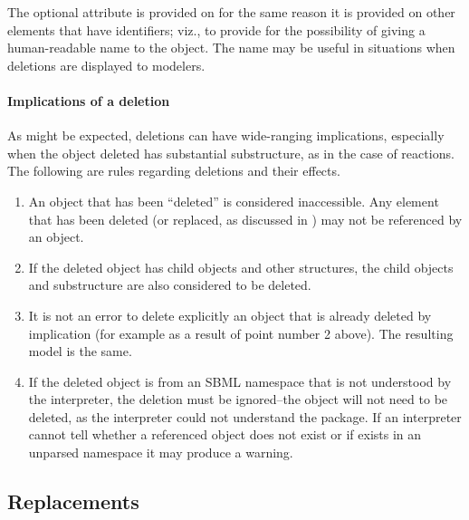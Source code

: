 The optional  attribute is provided on \Deletion for the same reason it is provided on other elements that have identifiers; viz., to provide for the possibility of giving a human-readable name to the object.  The name may be useful in situations when deletions are displayed to modelers.


\paragraph{Implications of a deletion}

As might be expected, deletions can have wide-ranging implications, especially when the object deleted has substantial substructure, as in the case of reactions.  The following are rules regarding deletions and their effects.

\begin{enumerate}

\item An object that has been ``deleted'' is considered inaccessible. Any element that has been deleted (or replaced, as discussed in ) may not be referenced by an \SBaseRef object.

\item If the deleted object has child objects and other structures, the child objects and substructure are also considered to be deleted.

\item It is not an error to delete explicitly an object that is already deleted by implication (for example as a result of point number 2 above).  The resulting model is the same.

\item If the deleted object is from an SBML namespace that is not understood by the interpreter, the deletion must be ignored--the  object will not need to be deleted, as the interpreter could not understand the package.  If an interpreter cannot tell whether  a referenced object does not exist or if exists in an unparsed namespace it may produce a warning.

\end{enumerate}



\subsection{Replacements}
\label{replacements}
\label{extended-sbase-class}

